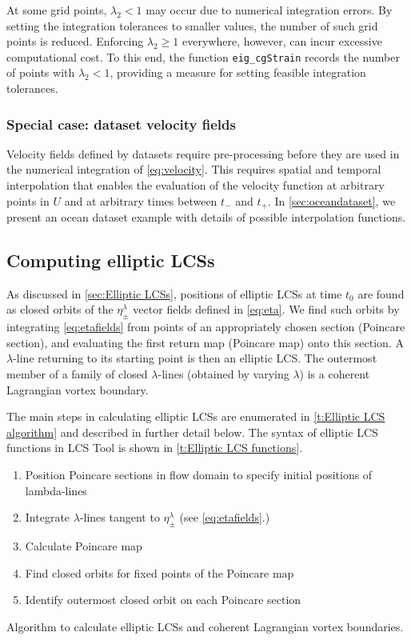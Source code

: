 \documentclass{article}
\begin{document}
At some grid points, $\lambda_2 < 1$ may occur due to numerical integration errors. By setting the integration tolerances to smaller values, the number of such grid points is reduced. Enforcing $\lambda_2 \geq 1$ everywhere, however, can incur excessive computational cost. To this end, the function \lstinline!eig_cgStrain! records the number of points with $\lambda_2 < 1$, providing a measure for setting feasible integration tolerances.

\subsubsection{Special case: dataset velocity fields}

Velocity fields defined by datasets require pre-processing before
they are used in the numerical integration of \cref{eq:velocity}. This requires spatial and temporal interpolation that enables the evaluation of the velocity function at arbitrary points in $U$ and at arbitrary times between $t_-$ and $t_+$. In \cref{sec:oceandataset}, we present an ocean dataset example with details of possible interpolation functions.

\subsection{Computing elliptic LCSs}

As discussed in \cref{sec:Elliptic LCSs}, positions of elliptic LCSs at time $t_0$ are found as closed orbits of the $\eta_\pm^\lambda$ vector fields defined in \cref{eq:eta}. We find such orbits by integrating \cref{eq:etafields} from points of an appropriately chosen section (Poincare section), and evaluating the first return map (Poincare map) onto this section. A $\lambda$-line returning to its starting point is then an elliptic LCS. The outermost member of a family of closed $\lambda$-lines (obtained by varying $\lambda$) is a coherent Lagrangian vortex boundary\parencite{haller13:_coher_lagran}.

The main steps in calculating elliptic LCSs are enumerated in \cref{t:Elliptic LCS algorithm} and described in further detail below. The syntax of elliptic LCS functions in LCS Tool is shown in \cref{t:Elliptic LCS functions}.

\begin{table}
\begin{center}
\begin{enumerate}
\item Position Poincare sections in flow domain to specify initial positions of lambda-lines
\item Integrate $\lambda$-lines tangent to $\eta_\pm^\lambda$ (see \cref{eq:etafields}.)
\item Calculate Poincare map
\item Find closed orbits for fixed points of the Poincare map
\item Identify outermost closed orbit on each Poincare section
\end{enumerate}
\end{center}
\caption{Algorithm to calculate elliptic LCSs and coherent Lagrangian vortex boundaries.}
\label{t:Elliptic LCS algorithm}
\end{table}
\end{document}
